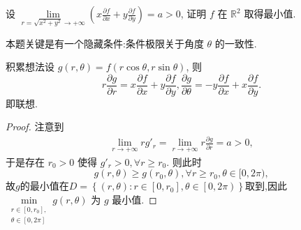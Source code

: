 \documentclass[../../main.tex]{subfiles}
\begin{document}
\begin{example}
设 \( \lim\limits_{r = \sqrt{x^2 + y^2} \to +\infty} \left( x \frac{\partial f}{\partial x} + y \frac{\partial f}{\partial y} \right) = a > 0 \), 证明 \( f \) 在 \( \mathbb{R}^2 \) 取得最小值.
\end{example}
\begin{remark}
本题关键是有一个隐藏条件:条件极限关于角度 \( \theta \) 的一致性.
\end{remark}
\begin{note}
积累想法设 \( g(r, \theta) = f(r \cos \theta, r \sin \theta) \), 则
\[
r \frac{\partial g}{\partial r} = x \frac{\partial f}{\partial x} + y \frac{\partial f}{\partial y}, \frac{\partial g}{\partial \theta} = -y \frac{\partial f}{\partial x} + x \frac{\partial f}{\partial y}.
\]
即联想.
\end{note}
\begin{proof}
注意到
\begin{align*}
\lim\limits_{r \to +\infty} r g'_r = \lim\limits_{r \to +\infty} r \frac{\partial g}{\partial r}= a > 0,
\end{align*}
于是存在 \( r_0 > 0 \) 使得 \( g'_r > 0, \forall r \geqslant r_0 \). 则此时
\[
g(r, \theta) \geqslant g(r_0, \theta), \forall r \geqslant r_0, \theta \in [0, 2\pi),
\]
故$g$的最小值在$D=\left\{ \left( r,\theta \right) :r\in \left[ 0,r_0 \right] ,\theta \in \left[ 0,2\pi \right) \right\}$取到,因此\( \min\limits_{\substack{r \in [0, r_0], \\ \theta \in [0, 2\pi]}} g(r, \theta) \) 为 \( g \) 最小值.

\end{proof}
\end{document}
